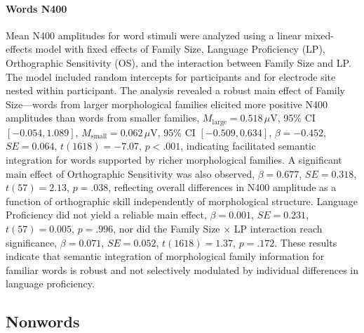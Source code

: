 \documentclass[utf8]{FrontiersinHarvard} %
\begin{document}
\paragraph*{Words N400}
Mean N400 amplitudes for word stimuli were analyzed using a linear mixed-effects model with fixed effects of Family Size, Language Proficiency (LP), Orthographic Sensitivity (OS), and the interaction between Family Size and LP. The model included random intercepts for participants and for electrode site nested within participant. The analysis revealed a robust main effect of Family Size—words from larger morphological families elicited more positive N400 amplitudes than words from smaller families, $M_{\mathrm{large}} = 0.518\,\mu$V, 95\% CI $[-0.054, 1.089]$, $M_{\mathrm{small}} = 0.062\,\mu$V, 95\% CI $[-0.509, 0.634]$, $\beta = -0.452$, $SE = 0.064$, $t(1618) = -7.07$, $p < .001$, indicating facilitated semantic integration for words supported by richer morphological families. A significant main effect of Orthographic Sensitivity was also observed, $\beta = 0.677$, $SE = 0.318$, $t(57) = 2.13$, $p = .038$, reflecting overall differences in N400 amplitude as a function of orthographic skill independently of morphological structure. Language Proficiency did not yield a reliable main effect, $\beta = 0.001$, $SE = 0.231$, $t(57) = 0.005$, $p = .996$, nor did the Family Size $\times$ LP interaction reach significance, $\beta = 0.071$, $SE = 0.052$, $t(1618) = 1.37$, $p = .172$. These results indicate that semantic integration of morphological family information for familiar words is robust and not selectively modulated by individual differences in language proficiency.


\subsection{Nonwords}
\end{document}

